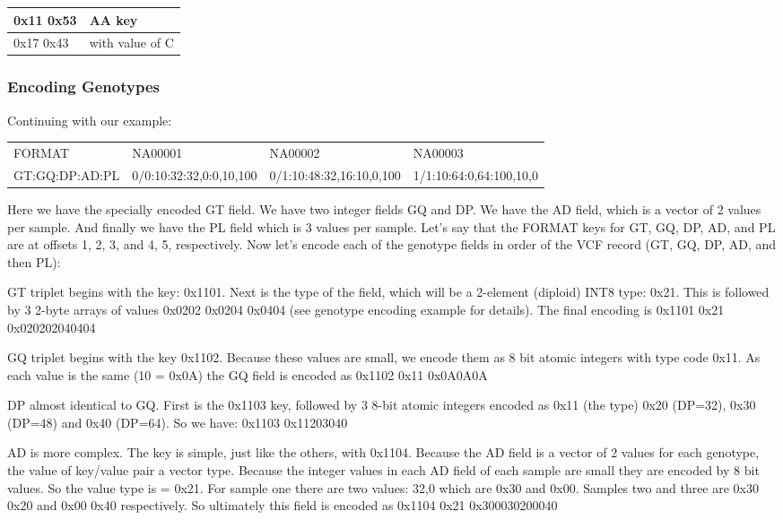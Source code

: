 \documentclass[8pt]{article}
\begin{document}
\vspace{0.3cm}
\begin{tabular}{|l |l|} \hline
0x11 0x53 & AA key \\ \hline
0x17 0x43 & with value of C \\ \hline
\end{tabular}

\subsubsection{Encoding Genotypes}

Continuing with our example:

\vspace{0.3cm}
\begin{tabular}{l l l l}
FORMAT & NA00001 & NA00002 & NA00003 \\
GT:GQ:DP:AD:PL & 0/0:10:32:32,0:0,10,100 & 0/1:10:48:32,16:10,0,100 & 1/1:10:64:0,64:100,10,0 \\
\end{tabular}
\vspace{0.3cm}

Here we have the specially encoded GT field.
We have two integer fields GQ and DP.
We have the AD field, which is a vector of 2 values per sample.
And finally we have the PL field which is 3 values per sample.
Let's say that the FORMAT keys for GT, GQ, DP, AD, and PL are at offsets 1, 2, 3, and 4, 5, respectively.
Now let's encode each of the genotype fields in order of the VCF record (GT, GQ, DP, AD, and then PL):

GT triplet begins with the key: 0x1101.
Next is the type of the field, which will be a 2-element (diploid) INT8 type: 0x21.
This is followed by 3 2-byte arrays of values 0x0202 0x0204 0x0404 (see genotype encoding example for details).
The final encoding is 0x1101 0x21 0x020202040404

GQ triplet begins with the key 0x1102.
Because these values are small, we encode them as 8 bit atomic integers with type code 0x11.
As each value is the same (10 = 0x0A) the GQ field is encoded as 0x1102 0x11 0x0A0A0A

DP almost identical to GQ.
First is the 0x1103 key, followed by 3 8-bit atomic integers encoded as 0x11 (the type) 0x20 (DP=32), 0x30 (DP=48) and 0x40 (DP=64).
So we have: 0x1103 0x11203040

AD is more complex.
The key is simple, just like the others, with 0x1104.
Because the AD field is a vector of 2 values for each genotype, the value of key/value pair a vector type.
Because the integer values in each AD field of each sample are small they are encoded by 8 bit values.
So the value type is = 0x21.
For sample one there are two values: 32,0 which are 0x30 and 0x00.
Samples two and three are 0x30 0x20 and 0x00 0x40 respectively.
So ultimately this field is encoded as 0x1104 0x21 0x300030200040
\end{document}

